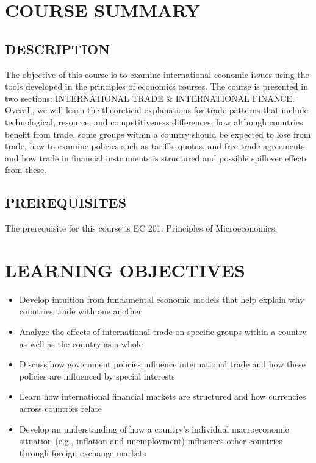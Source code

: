 \documentclass[11pt]{article}
\begin{document}
\selectfont



\bigskip

\section*{COURSE SUMMARY}

\begin{center}
    \end{center}

\subsection*{DESCRIPTION}
The objective of this course is to examine international economic issues using the tools developed in the principles of economics courses. 
The course is presented in two sections: INTERNATIONAL TRADE \& INTERNATIONAL FINANCE.
Overall, we will learn the theoretical explanations for trade patterns that include technological, resource, and competitiveness differences, 
how although countries benefit from trade, some groups within a country should be expected to lose from trade, 
how to examine policies such as tariffs, quotas, and free-trade agreements, 
and how trade in financial instruments is structured and possible spillover effects from these. 

\subsection*{PREREQUISITES}
The prerequisite for this course is EC 201: Principles of Microeconomics. 

\section*{LEARNING OBJECTIVES}
\begin{itemize}
    \item Develop intuition from fundamental economic models that help explain why countries trade with one another
    \item Analyze the effects of international trade on specific groups within a country as well as the country as a whole
    \item Discuss how government policies influence international trade and how these policies are influenced by special interests 
    \item Learn how international financial markets are structured and how currencies across countries relate
    \item Develop an understanding of how a country's individual macroeconomic situation (e.g., inflation and unemployment) influences other countries through foreign exchange markets
\end{itemize}
\end{document}
